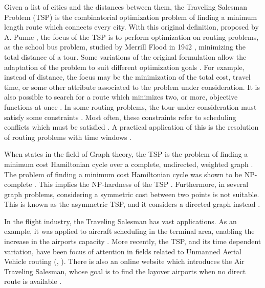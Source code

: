 Given a list of cities and the distances between them, the Traveling Salesman Problem (TSP) is the combinatorial optimization problem of finding a minimum length route which connects every city. With this original definition, proposed by A. Punne \cite{cite_1}, the focus of the TSP is to perform optimization on routing problems, as the school bus problem, studied by Merrill Flood in 1942 \cite{cite_2}, minimizing the total distance of a tour. Some variations of the original formulation allow the adaptation of the problem to suit different optimization goals \cite{cite_3}. For example, instead of distance, the focus may be the minimization of the total cost, travel time, or some other attribute associated to the problem under consideration. It is also possible to search for a route which minimizes two, or more, objective functions at once \cite{cite_4}.  In some routing problems, the tour under consideration must satisfy some constraints \cite{cite_8}. Most often, these constraints refer to scheduling conflicts which must be satisfied \cite{cite_9}. A practical application of this is the resolution of routing problems with time windows \cite{cite_10}.

When states in the field of Graph theory, the TSP is the problem of finding a minimum cost Hamiltonian cycle over a complete, undirected, weighted graph \cite{cite_5}. The problem of finding a minimum cost Hamiltonian cycle was shown to be NP-complete \cite{np_completeness}. This implies the NP-hardness of the TSP \cite{cite_6}. Furthermore, in several graph problems, considering a symmetric cost between two points is not suitable. This is known as the asymmetric TSP, and it considers a directed graph instead \cite{cite_7}.

In the flight industry, the Traveling Salesman has vast applications. As an example, it was applied to aircraft scheduling in the terminal area, enabling the increase in the airports capacity \cite{cite_14}. More recently, the TSP, and its time dependent variation, have been focus of attention in fields related to Unmanned Aerial Vehicle routing (\cite{cite_16}, \cite{cite_17}). There is also an online website which introduces the Air Traveling Salesman, whose goal is to find the layover airports when no direct route is available \cite{cite_15}.

